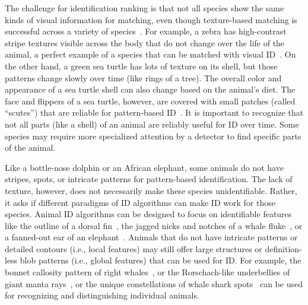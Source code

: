 The challenge for identification ranking is that not all species show the same kinds of visual information for matching, even though texture-based matching is successful across a variety of species~\cite{barord_comparative_2014,chehrsimin_automatic_2018,miguel_identifying_2019,morrison_individual_2016,nipko_identifying_2020,park_where_2019,patel_shot_2020,shukla_hybrid_2019,weinstein_m_2015}.  For example, a zebra has high-contrast stripe textures visible across the body that do not change over the life of the animal, a perfect example of a species that can be matched with visual ID~\cite{crall_hotspotter_2013,hiby_computer_1990,berger-wolf_wildbook_2017,lea_non-invasive_2018,oddone_mobile_2016}.  On the other hand, a green sea turtle has lots of texture on its shell, but those patterns change slowly over time (like rings of a tree).  The overall color and appearance of a sea turtle shell can also change based on the animal's diet.  The face and flippers of a sea turtle, however, are covered with small patches (called ``scutes'') that are reliable for pattern-based ID~\cite{dunbar_hotspotter_2017,dunbar_hotspotter_2021}.  It is important to recognize that not all parts (like a shell) of an animal are reliably useful for ID over time. Some species may require more specialized attention by a detector to find specific parts of the animal.

Like a bottle-nose dolphin or an African elephant, some animals do not have stripes, spots, or intricate patterns for pattern-based identification.  The lack of texture, however, does not necessarily make these species unidentifiable.  Rather, it asks if different paradigms of ID algorithms can make ID work for those species.  Animal ID algorithms can be designed to focus on identifiable features like the outline of a dorsal fin~\cite{hughes_automated_2017}, the jagged nicks and notches of a whale fluke~\cite{blount_flukebookcontinuing_2020,blount_flukebookrecent_2019,calambokidis_update_2017,franklin_photo-identification_2020}, or a fanned-out ear of an elephant~\cite{weideman_contour-based_2019,kulits_elephantbook_2021}.  Animals that do not have intricate patterns or detailed contours (i.e., local features) may still offer large structures or definition-less blob patterns (i.e., global features) that can be used for ID.  For example, the bonnet callosity pattern of right whales~\cite{polzounov_right_2016,bogucki_applying_2019,kabani_improving_2017,kabani_north_2016,norman_does_2016}, or the Rorschach-like underbellies of giant manta rays~\cite{moskvyak_robust_2019}, or the unique constellations of whale shark spots~\cite{araujo_getting_2020,mckinney_long-term_2017,batbouta_computer_2017} can be used for recognizing and distinguishing individual animals.

